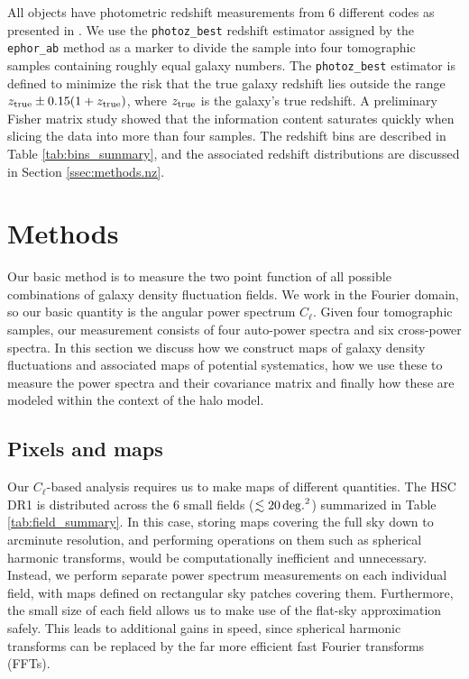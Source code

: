 \documentclass[a4paper,11pt]{article}
\begin{document}
  All objects have photometric redshift measurements from 6 different codes as presented in \cite{2018PASJ...70S...9T}. We use the {\tt photoz\_best} redshift estimator assigned by the {\tt ephor\_ab} method as a marker to divide the sample into four tomographic samples containing roughly equal galaxy numbers. The {\tt photoz\_best} estimator is defined to minimize the risk that the true galaxy redshift lies outside the range $z_{\rm true}\pm 0.15(1+z_{\rm true})$, where $z_{\rm true}$ is the galaxy's true redshift. A preliminary Fisher matrix \cite{Fisher:1935} study showed that the information content saturates quickly when slicing the data into more than four samples. The redshift bins are described in Table \ref{tab:bins_summary}, and the associated redshift distributions are discussed in Section \ref{ssec:methods.nz}.

\section{Methods}\label{sec:methods}

Our basic method is to measure the two point function of all possible combinations of galaxy density fluctuation fields. We work in the Fourier domain, so our basic quantity is the angular power spectrum $C_\ell$. Given four tomographic samples, our measurement consists of four auto-power spectra and six cross-power spectra. In this section we discuss how we construct maps of galaxy density fluctuations and associated maps of potential systematics, how we use these to measure the power spectra and their covariance matrix and finally how these are modeled within the context of the halo model.


  \subsection{Pixels and maps}\label{ssec:methods.pix}
    Our $C_\ell$-based analysis requires us to make maps of different quantities. The HSC DR1 is distributed across the 6 small fields ($\lesssim20\,{\rm deg.}^2$) summarized in Table \ref{tab:field_summary}. In this case, storing maps covering the full sky down to arcminute resolution, and performing operations on them such as spherical harmonic transforms, would be computationally inefficient and unnecessary. Instead, we perform separate power spectrum measurements on each individual field, with maps defined on rectangular sky patches covering them. Furthermore, the small size of each field allows us to make use of the flat-sky approximation safely. This leads to additional gains in speed, since spherical harmonic transforms can be replaced by the far more efficient fast Fourier transforms (FFTs).
    
\end{document}
